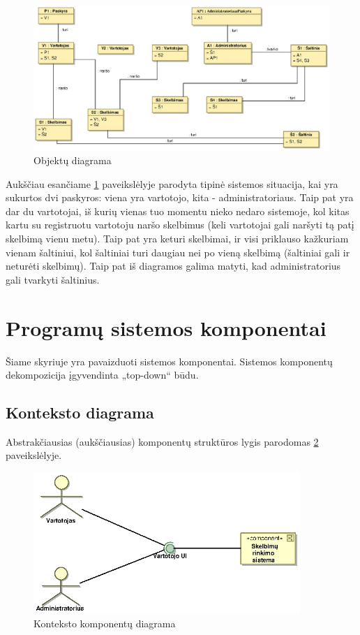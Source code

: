 \documentclass[12pt]{article}
\begin{document}
	\begin{figure}[h]
		\begin{center}
			\includegraphics[width=\textwidth]{ObjektuDiagrama.eps}
			\caption{Objektų diagrama\label{ObjectDiagram}}
		\end{center}
	\end{figure}
	
	Aukščiau esančiame \ref{ObjectDiagram} paveikslėlyje parodyta tipinė sistemos situacija, kai yra sukurtos dvi paskyros: viena yra vartotojo, kita - administratoriaus. Taip pat yra dar du vartotojai, iš kurių vienas tuo momentu nieko nedaro sistemoje, kol kitas kartu su registruotu vartotoju naršo skelbimus (keli vartotojai gali naršyti tą patį skelbimą vienu metu). Taip pat yra keturi skelbimai, ir visi priklauso kažkuriam vienam šaltiniui, kol šaltiniai turi daugiau nei po vieną skelbimą (šaltiniai gali ir neturėti skelbimų). Taip pat iš diagramos galima matyti, kad administratorius gali tvarkyti šaltinius.
	\pagebreak
	
	\section{Programų sistemos komponentai}
	
	Šiame skyriuje yra pavaizduoti sistemos komponentai. Sistemos komponentų dekompozicija įgyvendinta „top-down“ būdu.	
	
	\subsection{Konteksto diagrama}
	Abstrakčiausias (aukščiausias) komponentų struktūros lygis parodomas \ref{Components1} paveikslėlyje.
	\begin{figure}[h]
		\begin{center}
			\includegraphics[width=0.9\textwidth]{Komponentai1.eps}
			\caption{Konteksto komponentų diagrama\label{Components1}}
		\end{center}
	\end{figure}
	
\end{document}
